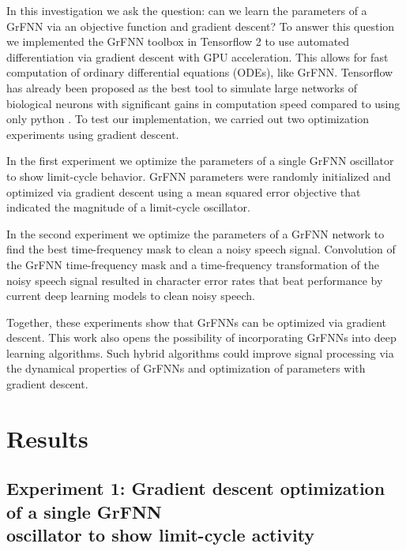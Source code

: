 \documentclass{report}
\begin{document}
In this investigation we ask the question: can we learn the parameters of a GrFNN via an objective function and gradient descent? To answer this question we implemented the GrFNN toolbox in Tensorflow 2 to use automated differentiation via gradient descent with GPU acceleration. This allows for fast computation of ordinary differential equations (ODEs), like GrFNN. Tensorflow has already been proposed as the best tool to simulate large networks of biological neurons with significant gains in computation speed compared to using only python \cite{mohanta2019parallel}. To test our implementation, we carried out two optimization experiments using gradient descent.

In the first experiment we optimize the parameters of a single GrFNN oscillator to show limit-cycle behavior. GrFNN parameters were randomly initialized and optimized via gradient descent using a mean squared error objective that indicated the magnitude of a limit-cycle oscillator.

In the second experiment we optimize the parameters of a GrFNN network to find the best time-frequency mask to clean a noisy speech signal. Convolution of the GrFNN time-frequency mask and a time-frequency transformation of the noisy speech signal resulted in character error rates that beat performance by current deep learning models to clean noisy speech. 

Together, these experiments show that GrFNNs can be optimized via gradient descent. This work also opens the possibility of incorporating GrFNNs into deep learning algorithms. Such hybrid algorithms could improve signal processing via the dynamical properties of GrFNNs and optimization of parameters with gradient descent.

\section{Results}

\subsection{Experiment 1: Gradient descent optimization of a single GrFNN \\ oscillator to show limit-cycle activity} 
\end{document}
